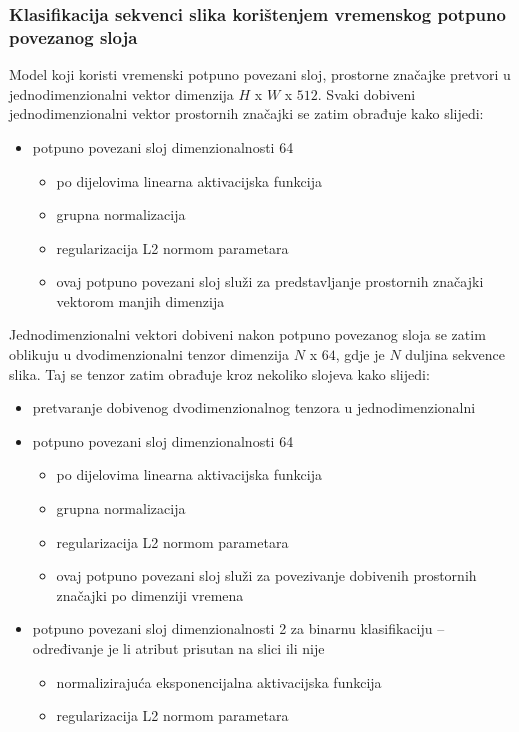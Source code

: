 \documentclass[times, utf8, diplomski, numeric]{fer}
\begin{document}
\subsubsection{Klasifikacija sekvenci slika korištenjem vremenskog potpuno povezanog sloja}
Model koji koristi vremenski potpuno povezani sloj, prostorne značajke pretvori u jednodimenzionalni vektor dimenzija $H$ x $W$ x $512$.
Svaki dobiveni jednodimenzionalni vektor prostornih značajki se zatim obrađuje kako slijedi:
\begin{itemize}
  \item potpuno povezani sloj dimenzionalnosti 64
 \begin{itemize}
  \item po dijelovima linearna  aktivacijska funkcija
  \item grupna normalizacija 
  \item regularizacija L2 normom parametara
  \item ovaj potpuno povezani sloj služi za predstavljanje prostornih značajki vektorom manjih dimenzija
 \end{itemize}
\end{itemize}
Jednodimenzionalni vektori dobiveni nakon potpuno povezanog sloja se zatim oblikuju u dvodimenzionalni tenzor dimenzija $N$ x $64$, gdje je $N$ duljina sekvence slika.
Taj se tenzor zatim obrađuje kroz nekoliko slojeva kako slijedi:
\begin{itemize}
 \item pretvaranje dobivenog dvodimenzionalnog tenzora u jednodimenzionalni
 \item potpuno povezani sloj dimenzionalnosti 64
 \begin{itemize}
  \item po dijelovima linearna  aktivacijska funkcija
  \item grupna normalizacija 
  \item regularizacija L2 normom parametara
  \item ovaj potpuno povezani sloj služi za povezivanje dobivenih prostornih značajki po dimenziji vremena
 \end{itemize}
 \item potpuno povezani sloj dimenzionalnosti 2 za binarnu klasifikaciju -- određivanje je li atribut prisutan na slici ili nije
 \begin{itemize}
  \item normalizirajuća eksponencijalna  aktivacijska funkcija
  \item regularizacija L2 normom parametara
 \end{itemize}
\end{itemize}
\end{document}
